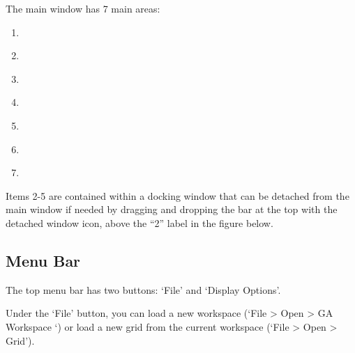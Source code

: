 \documentclass[letterpaper,10pt,english,openany,oneside]{sphinxmanual}
\begin{document}
The main window has 7 main areas:
\begin{enumerate}
%
\item {} 
{\hyperref[\detokenize{content/getting_started/GUI_overview:menu-bar}]{}}

\item {} 
{\hyperref[\detokenize{content/getting_started/GUI_overview:pre-processing}]{}}

\item {} 
{\hyperref[\detokenize{content/getting_started/GUI_overview:transform-parameters}]{}}

\item {} 
{\hyperref[\detokenize{content/getting_started/GUI_overview:recalculate-buttons}]{}}

\item {} 
{\hyperref[\detokenize{content/getting_started/GUI_overview:plots-options}]{}}

\item {} 
{\hyperref[\detokenize{content/getting_started/GUI_overview:plot-window}]{}}

\item {} 
{\hyperref[\detokenize{content/getting_started/GUI_overview:toolbar}]{}}

\end{enumerate}

Items 2-5 are contained within a docking window that can be detached from the main window if needed by dragging and dropping the bar at the top with the detached window icon, above the “2” label in the figure below.

\begin{figure}[H]
\centering

\noindent{}
\end{figure}


\subsection{Menu Bar}
\label{\detokenize{content/getting_started/GUI_overview:menu-bar}}\label{\detokenize{content/getting_started/GUI_overview:id1}}
The top menu bar has two buttons: ‘File’ and ‘Display Options’.

Under the ‘File’ button, you can load a new workspace (‘File \textendash{}\textgreater{} Open \textendash{}\textgreater{} GA Workspace
‘) or load a new grid from the current workspace (‘File \textendash{}\textgreater{} Open \textendash{}\textgreater{} Grid’).
\end{document}
